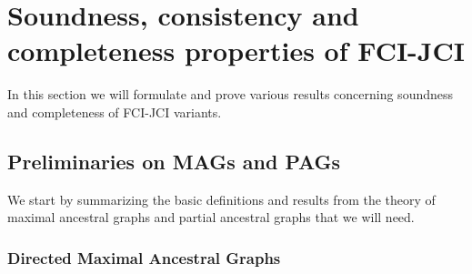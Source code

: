 \documentclass[twoside,11pt]{article}
\begin{document}
\section{Soundness, consistency and completeness properties of FCI-JCI}\label{sec:app:fcijci}

In this section we will formulate and prove various results concerning soundness and completeness of FCI-JCI variants.

\subsection{Preliminaries on MAGs and PAGs}\label{sec:app:preliminaries}

We start by summarizing the basic definitions and results from the theory of maximal ancestral graphs and partial ancestral graphs \citep{SGS2000,RichardsonSpirtes02,Zhang2006,Zhang2008_AI,Zhang2008_JMLR} that we will need.

\subsubsection{Directed Maximal Ancestral Graphs}\label{sec:app:dmag}
\end{document}
